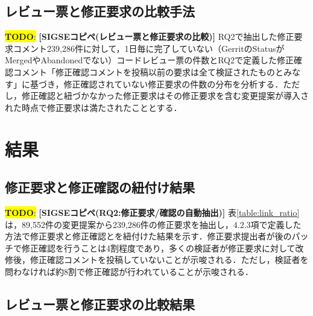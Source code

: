 \documentclass[11pt]{jreport}
\newcommand{\todo}[1]{\colorbox{yellow}{{\bf TODO}:}{\color{red} {\textbf{[#1]}}}}
\begin{document}
\subsection{レビュー票と修正要求の比較手法}

\todo{SIGSEコピペ(レビュー票と修正要求の比較)}
RQ2で抽出した修正要求コメント239,286件に対して，1日毎に完了していない（GerritのStatusがMergedやAbandonedでない）コードレビュー票の件数とRQ2で定義した修正確認コメント「修正確認コメントを投稿以前の要求は全て検証されたものとみなす」に基づき，修正確認されていない修正要求の件数の分布を分析する．ただし，修正確認と紐づかなかった修正要求はその修正要求を含む変更提案が導入された時点で修正要求は満たされたこととする．

\section{結果}
\subsection{修正要求と修正確認の紐付け結果}

\todo{SIGSEコピペ(RQ2:修正要求/確認の自動抽出)}
表\ref{table:link_ratio}は，89,552件の変更提案から239,286件の修正要求を抽出し，4.2.3項で定義した方法で修正要求と修正確認とを紐付けた結果を示す．修正要求提出者が後のパッチで修正確認を行うことは4割程度であり，多くの検証者が修正要求に対して改修後，修正確認コメントを投稿していないことが示唆される．ただし，検証者を問わなければ約8割で修正確認が行われていることが示唆される．

\begin{table}[t]
\centering
  \caption{定義毎に修正要求(239,286件)と紐づいた割合}
  \label{table:link_ratio}
\end{table}

\subsection{レビュー票と修正要求の比較結果}
\end{document}
